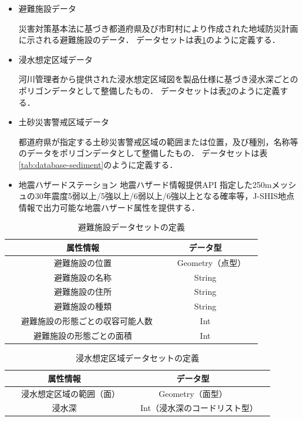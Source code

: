 \documentclass[a4paper]{jsarticle}
\begin{document}
\begin{itemize}
  \item 避難施設データ

  災害対策基本法に基づき都道府県及び市町村により作成された地域防災計画に示される避難施設のデータ．
  データセットは表\ref{tab:database-facility}のように定義する．

  \item 浸水想定区域データ

  河川管理者から提供された浸水想定区域図を製品仕様に基づき浸水深ごとのポリゴンデータとして整備したもの．
  データセットは表\ref{tab:database-flood}のように定義する．

  \item 土砂災害警戒区域データ

  都道府県が指定する土砂災害警戒区域の範囲または位置，及び種別，名称等のデータをポリゴンデータとして整備したもの．
  データセットは表\ref{tab:database-sediment}のように定義する．

  \item 地震ハザードステーション 地震ハザード情報提供API
  指定した250mメッシュの30年震度5弱以上/5強以上/6弱以上/6強以上となる確率等，J-SHIS地点情報で出力可能な地震ハザード属性を提供する．

\end{itemize}

\begin{table}[H]
  \begin{center}
    \caption{避難施設データセットの定義}
    \renewcommand\arraystretch{1.4}
    \begin{tabular}{|c|c|c|}
      \hline
      属性情報 & データ型 \\
      \hline
      \hline
      避難施設の位置 & 　Geometry（点型）　 \\
      \hline
      避難施設の名称 & String \\
      \hline
      避難施設の住所 & String \\
      \hline
      避難施設の種類 & String \\
      \hline
      　避難施設の形態ごとの収容可能人数　 & Int \\
      \hline
      避難施設の形態ごとの面積 & Int  \\
      \hline
    \end{tabular}
    \label{tab:database-facility}
  \end{center}
\end{table}

\begin{table}[H]
  \begin{center}
    \caption{浸水想定区域データセットの定義}
    \renewcommand\arraystretch{1.4}
    \begin{tabular}{|c|c|c|}
      \hline
      属性情報 & データ型 \\
      \hline
      \hline
      　浸水想定区域の範囲（面）　 & Geometry（面型） \\
      \hline
      浸水深 & 　Int（浸水深のコードリスト型）　\\
      \hline
    \end{tabular}
    \label{tab:database-flood}
  \end{center}
\end{table}
\end{document}
